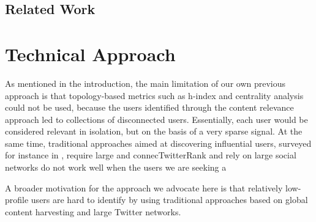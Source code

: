 \documentclass[runningheads]{llncs}
\begin{document}
\subsection{Related Work}



\section{Technical Approach}


As mentioned in the introduction, the main limitation of our own previous approach 	\cite{Missier2017,Sousa2018,Barros2018} is that topology-based metrics such as h-index and centrality analysis could not be used, because the users identified through the content relevance approach led to collections of disconnected users. Essentially, each user would be considered relevant in isolation, but on the basis of a very sparse signal.
%
At the same time, traditional approaches aimed at discovering influential users, surveyed for instance in \cite{RIQUELME2016949}, require large and connecTwitterRank and rely on large social networks do not work well when the users we are seeking a 

A broader motivation for the approach we advocate here is that relatively low-profile users are hard to identify by using traditional approaches based on global content harvesting and large Twitter networks.
\end{document}
